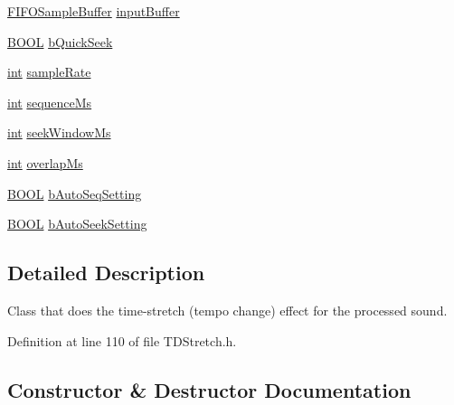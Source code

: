 \begin{DoxyCompactItemize}
\item 
\hyperlink{classsoundtouch_1_1_f_i_f_o_sample_buffer}{F\+I\+F\+O\+Sample\+Buffer} \hyperlink{classsoundtouch_1_1_t_d_stretch_a97d5742c0d2f30248733168172d54d03}{input\+Buffer}
\item 
\hyperlink{nfilterkit_8h_a3be13892ae7076009afcf121347dd319}{B\+O\+OL} \hyperlink{classsoundtouch_1_1_t_d_stretch_aeb8664ce8d3bd7b625b25273a5032045}{b\+Quick\+Seek}
\item 
\hyperlink{xmltok_8h_a5a0d4a5641ce434f1d23533f2b2e6653}{int} \hyperlink{classsoundtouch_1_1_t_d_stretch_a475226e8ef3d04ebcbb83e13ff8e78e0}{sample\+Rate}
\item 
\hyperlink{xmltok_8h_a5a0d4a5641ce434f1d23533f2b2e6653}{int} \hyperlink{classsoundtouch_1_1_t_d_stretch_ab6571642944948906bf5e2dd2b82a2a6}{sequence\+Ms}
\item 
\hyperlink{xmltok_8h_a5a0d4a5641ce434f1d23533f2b2e6653}{int} \hyperlink{classsoundtouch_1_1_t_d_stretch_aa1bd4510b56e3dcdcc68fd9cce930fec}{seek\+Window\+Ms}
\item 
\hyperlink{xmltok_8h_a5a0d4a5641ce434f1d23533f2b2e6653}{int} \hyperlink{classsoundtouch_1_1_t_d_stretch_a8c3185aed01ad4714c68ef0f3947769d}{overlap\+Ms}
\item 
\hyperlink{nfilterkit_8h_a3be13892ae7076009afcf121347dd319}{B\+O\+OL} \hyperlink{classsoundtouch_1_1_t_d_stretch_a9a52a469732c4f5e884d62b5eabebc6e}{b\+Auto\+Seq\+Setting}
\item 
\hyperlink{nfilterkit_8h_a3be13892ae7076009afcf121347dd319}{B\+O\+OL} \hyperlink{classsoundtouch_1_1_t_d_stretch_a8b241cf654e8c29b7ff7af3f359866a7}{b\+Auto\+Seek\+Setting}
\end{DoxyCompactItemize}


\subsection{Detailed Description}
Class that does the time-\/stretch (tempo change) effect for the processed sound. 

Definition at line 110 of file T\+D\+Stretch.\+h.



\subsection{Constructor \& Destructor Documentation}
